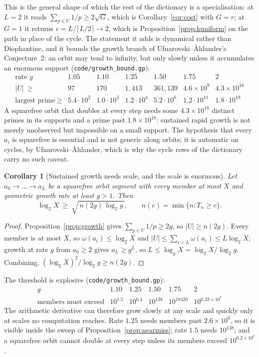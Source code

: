 \documentclass[11pt]{article}
\newtheorem{corollary}[theorem]{Corollary}
\theoremstyle{definition}
\begin{document}
This is the general shape of which the rest of the dictionary is a specialisation: at $L=2$ it reads
$\sum_{p\in U}1/p\ge2\sqrt G$, which is Corollary~\ref{cor:cost} with $G=r$; at $G=1$ it returns
$c=L/\lceil L/2\rceil\to2$, which is Proposition~\ref{prop:kuniform} on the path in place of the
cycle. The statement it adds is dynamical rather than Diophantine, and it bounds the growth branch
of Ufnarovski--\AA hlander's Conjecture~2: an orbit may tend to infinity, but only slowly unless it
accumulates an enormous support \textup{(\texttt{code/growth\_bound.gp})}:
\[
\begin{array}{l|cccccc}
\text{rate }g & 1.05 & 1.10 & 1.25 & 1.50 & 1.75 & 2\\\hline
|U|\ \ge & 97 & 170 & 1{,}413 & 361{,}139 & 4.6\times10^{9} & 4.3\times10^{16}\\
\text{largest prime}\ \ge & 5.4\!\cdot\!10^{2} & 1.0\!\cdot\!10^{3} & 1.2\!\cdot\!10^{4} &
 5.2\!\cdot\!10^{6} & 1.2\!\cdot\!10^{11} & 1.8\!\cdot\!10^{18}
\end{array}
\]
A squarefree orbit that doubles at every step needs some $4.3\times10^{16}$ distinct primes in its
supports and a prime past $1.8\times10^{18}$: sustained rapid growth is not merely unobserved but
impossible on a small support. The hypothesis that every $a_i$ is squarefree is essential and is not
generic along orbits; it is automatic on cycles, by Ufnarovski--\AA hlander, which is why the cycle
rows of the dictionary carry no such caveat.

\begin{corollary}[Sustained growth needs scale, and the scale is enormous]\label{cor:growthscale}
Let $a_0\to\dots\to a_L$ be a squarefree orbit segment with every member at most $X$ and geometric
growth rate at least $g>1$. Then
\[ \log_2X\ \ge\ \sqrt{\,n(2g)\,\log_2 g\,},\qquad n(c)=\min\{n:T_n\ge c\}. \]
\end{corollary}
\begin{proof}
Proposition~\ref{prop:growth} gives $\sum_{p\in U}1/p\ge2g$, so $|U|\ge n(2g)$. Every member is at
most $X$, so $\omega(a_i)\le\log_2X$ and $|U|\le\sum_{i<L}\omega(a_i)\le L\log_2X$; growth at rate
$g$ from $a_0\ge2$ gives $a_L\ge g^{L}$, so $L\le\log_gX=\log_2X/\log_2g$. Combining,
$(\log_2X)^2/\log_2g\ge n(2g)$.
\end{proof}

The threshold is explosive \textup{(\texttt{code/growth\_bound.gp})}:
\[
\begin{array}{l|ccccc}
g & 1.10 & 1.25 & 1.50 & 1.75 & 2\\\hline
\text{members must exceed} & 10^{1.5} & 10^{6.4} & 10^{138} & 10^{18420} &
 10^{6.23\times10^{7}}
\end{array}
\]
The arithmetic derivative can therefore grow slowly at any scale and quickly only at scales no
computation reaches. Rate $1.25$ needs members past $2.6\times10^{6}$, so it is visible inside the
sweep of Proposition~\ref{prop:nearmiss}; rate $1.5$ needs $10^{138}$; and a squarefree orbit cannot
double at every step unless its members exceed $10^{6.2\times10^{7}}$.
\end{document}
